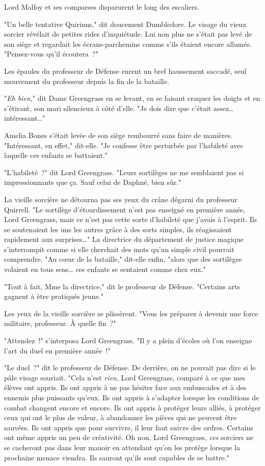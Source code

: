 Lord Malfoy et ses comparses disparurent le long des escaliers.

"Un belle tentative Quirinus," dit doucement Dumbledore. Le visage du vieux sorcier révélait de petites rides d'inquiétude. Lui non plus ne s'était pas levé de son siège et regardait les écrans-parchemins comme s'ils étaient encore allumés. "Pensez-vous qu'il écoutera~?"

Les épaules du professeur de Défense eurent un bref haussement saccadé, seul mouvement du professeur depuis la fin de la bataille.

"\emph{Eh bien}," dit Dame Greengrass en se levant, en se faisant craquer les doigts et en s'étirant, son mari silencieux à côté d'elle. "Je dois dire que c'était assez… intéressant…"

Amelia Bones s'était levée de son siège rembourré sans faire de manières. "Intéressant, en effet," dit-elle. "Je confesse être perturbée par l'habileté avec laquelle ces enfants se battaient."

"L'habileté~?" dit Lord Greengrass. "Leurs sortilèges ne me semblaient pas si impressionnants que ça. Sauf celui de Daphné, bien sûr."

La vieille sorcière ne détourna pas ses yeux du crâne dégarni du professeur Quirrell. "Le sortilège d'étourdissement n'est pas enseigné en première année, Lord Greengrass, mais ce n'est pas cette sorte d'habileté que j'avais à l'esprit. Ils se soutenaient les uns les autres grâce à des sorts simples, ils réagissaient rapidement aux surprises…" La directrice du département de justice magique s'interrompit comme si elle cherchait des mots qu'un simple civil pourrait comprendre. "Au cœur de la bataille," dit-elle enfin, "alors que des sortilèges volaient en tous sens… ces enfants se sentaient comme chez eux."

"Tout à fait, Mme la directrice," dit le professeur de Défense. "Certains arts gagnent à être pratiqués jeune."

Les yeux de la vieille sorcière se plissèrent. "Vous les préparez à devenir une force militaire, professeur. À quelle fin~?"

"Attendez~!" s'interposa Lord Greengrass. "Il y a plein d'écoles où l'on enseigne l'art du duel en première année~!"

"Le duel~?" dit le professeur de Défense. De derrière, on ne pouvait pas dire si le pâle visage souriait. "Cela n'est \emph{rien}, Lord Greengrass, comparé à ce que mes élèves ont appris. Ils ont appris à ne pas hésiter face aux embuscades et à des ennemis plus puissants qu'eux. Ils ont appris à s'adapter lorsque les conditions de combat changent encore et encore. Ils ont appris à protéger leurs alliés, à protéger ceux qui ont le plus de valeur, à abandonner les pièces qui ne peuvent être sauvées. Ils ont appris que pour survivre, il leur faut suivre des ordres. Certains ont même appris un peu de créativité. Oh non, Lord Greengrass, \emph{ces} sorciers ne se cacheront pas dans leur manoir en attendant qu'on les protège lorsque la prochaine menace viendra. Ils sauront qu'ils sont capables de se battre."

